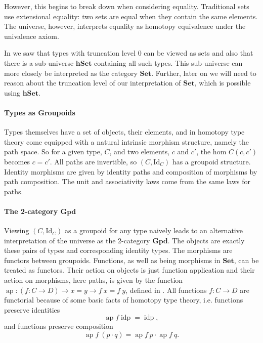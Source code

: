 \documentclass[12pt, parskip, DIV=14]{scrbook}
\newcommand{\ap}{\operatorname{ap}}
\newcommand{\idp}{\operatorname{idp}}
\newcommand{\hSet}{\mathbf{hSet}}
\newcommand{\Gpd}{\mathbf{Gpd}}
\begin{document}
However, this begins to break down when considering equality. Traditional sets use extensional equality: two sets are equal when they contain the same elements. The universe, however, interprets equality as homotopy equivalence under the univalence axiom.

In  we saw that types with truncation level $0$ can be viewed as sets and also that there is a sub-universe $\hSet$ containing all such types. This sub-universe can more closely be interpreted as the category $\mathbf{Set}$. Further, later on we will need to reason about the truncation level of our interpretation of $\mathbf{Set}$, which is possible using $\hSet$.

\paragraph{Types as Groupoids}

Types themselves have a set of objects, their elements, and in homotopy type theory come equipped with a natural intrinsic morphism structure, namely the path space. So for a given type, $C$, and two elements, $c$ and $c'$, the hom $C(c, c')$ becomes $c = c'$. All paths are invertible, so $(C , \mathrm{Id}_C)$ has a groupoid structure. Identity morphisms are given by identity paths and composition of morphisms by path composition. The unit and associativity laws come from the same laws for paths.

\paragraph{The 2-category $\Gpd$}

Viewing $(C , \mathrm{Id}_C)$ as a groupoid for any type naively leads to an alternative interpretation of the universe as the 2-category $\Gpd$. The objects are exactly these pairs of types and corresponding identity types. The morphisms are functors between groupoids. Functions, as well as being morphisms in $\mathbf{Set}$, can be treated as functors. Their action on objects is just function application and their action on morphisms, here paths, is given by the function $\ap : (f : C \to D) \to x = y \to f~x = f~y$, defined in . All functions $f : C \to D$ are functorial because of some basic facts of homotopy type theory, i.e. functions preserve identities $$\ap f \idp = \idp,$$ and functions preserve composition $$\ap f~(p \cdot q) = \ap f~p \cdot \ap f~q.$$
\end{document}
